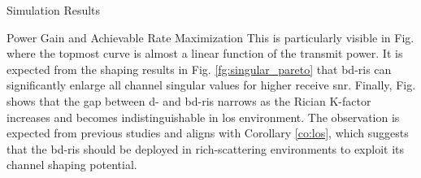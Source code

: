 \documentclass[journal]{IEEEtran}
\begin{document}
\begin{section}{Simulation Results}
\begin{subsection}{Power Gain and Achievable Rate Maximization}
		This is particularly visible in Fig.  where the topmost curve is almost a linear function of the transmit power.
		It is expected from the shaping results in Fig. \ref{fg:singular_pareto} that \gls{bd}-\gls{ris} can significantly enlarge all channel singular values for higher receive \gls{snr}.
		Finally, Fig.  shows that the gap between \gls{d}- and \gls{bd}-\gls{ris} narrows as the Rician K-factor increases and becomes indistinguishable in \gls{los} environment.
		The observation is expected from previous studies \cite{Shen2020a,Li2023b,Nerini2023} and aligns with Corollary \ref{co:los}, which suggests that the \gls{bd}-\gls{ris} should be deployed in rich-scattering environments to exploit its channel shaping potential.
	\end{subsection}
\end{section}
\end{document}

